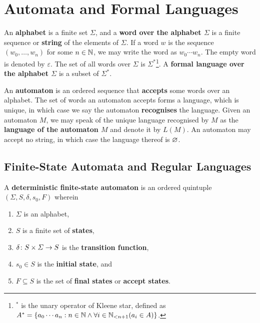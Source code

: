 



\section{Automata and Formal Languages}

An {\bf alphabet} is a finite set \(\varSigma\), and a {\bf word over the
alphabet \(\varSigma\)} is a finite sequence or {\bf string} of the elements of
\(\varSigma\). If a word \(w\) is the sequence \((w_0, \ldots, w_n)\) for some
\(n \in \setnat\), we may write the word as \(w_0 \cdots w_n\). The empty word
is denoted by \(\varepsilon\). The set of all words over \(\varSigma\) is
\(\varSigma^*\)\footnote{\(^*\) is the unary operator of Kleene star, defined as
\(A^* = \set{a_0 \cdots a_n : n \in \setnat \land \forall i \in \Nln[n + 1] (a_i
\in A)}\).}. A {\bf formal language over the alphabet \(\varSigma\)} is a subset
of \(\varSigma^*\).

An {\bf automaton} is an ordered sequence that {\bf accepts} some words over an
alphabet. The set of words an automaton accepts forms a language, which is
unique, in which case we say the automaton {\bf recognises} the language. Given
an automaton \(M\), we may speak of the unique language recognised by \(M\) as
the {\bf language of the automaton \(M\)} and denote it by \(L(M)\). An
automaton may accept no string, in which case the language thereof is \(\nset\).

\subsection{Finite-State Automata and Regular Languages}

\Bdf
    A {\bf deterministic finite-state automaton} is an ordered quintuple
    \((\varSigma, S, \delta, s_0, F)\) wherein
    \begin{enumerate}
        \item \(\varSigma\) is an alphabet,
        \item \(S\) is a finite set of {\bf states},
        \item \(\map{\delta}{S \times \varSigma}{S}\) is the {\bf transition
        function},
        \item \(s_0 \in S\) is the {\bf initial state}, and
        \item \(F \subseteq S\) is the set of {\bf final states} or {\bf accept
        states}.
    \end{enumerate}
\Edf

